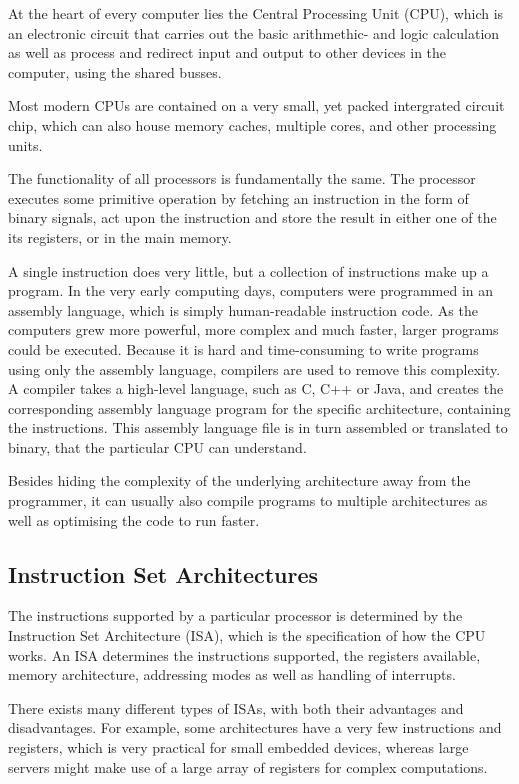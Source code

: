 At the heart of every computer lies the Central Processing Unit (CPU),
which is
an electronic circuit that carries out the basic arithmethic- and logic
calculation as well as process and redirect input and output to other devices
in the computer, using the shared busses.

Most modern CPUs are contained on a very small, yet packed intergrated circuit
chip, which can also house memory caches, multiple cores, and other processing
units.

The functionality of all processors is fundamentally the same. The processor
executes some primitive operation by fetching an instruction in the form of
binary signals, act upon the instruction and store the result in either
one of the its registers, or in the main memory.

A single instruction does very little, but a collection of instructions
make up
a program. In the very early computing days, computers were programmed in an
assembly language, which is simply human-readable instruction code. As the
computers grew more powerful, more complex and much faster, larger programs could be
executed. Because it is hard and time-consuming to write programs using
only the
assembly language, compilers are used to remove this complexity. A
compiler takes a high-level language, such as C, C++ or Java, and creates the
corresponding assembly language program for the specific architecture,
containing the instructions. This assembly language file is in turn assembled
or translated to binary, that the particular CPU can understand.

Besides hiding the complexity of the underlying architecture away from the
programmer, it can usually also compile programs to multiple architectures as
well as optimising the code to run faster.

\subsection{Instruction Set Architectures}
The instructions supported by a particular processor is determined by the
Instruction Set Architecture (ISA), which is the specification of how the CPU
works. An ISA determines the instructions
supported, the registers available, memory architecture, addressing modes as
well as handling of interrupts.

There exists many different types of ISAs, with both their advantages and
disadvantages. For example, some architectures have a very few instructions
and registers, which is very practical for small embedded devices,
whereas large
servers might make use of a large array of registers for complex computations.

